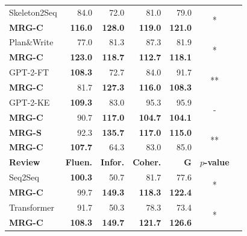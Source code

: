 \documentclass[letterpaper]{article} %
\begin{document}
\begin{table}[t]
{\begin{tabular}{|l|r|r|r|r|c|c|}
     Skeleton2Seq & 84.0 & 72.0  &  81.0 & 79.0&\multirow{2}{*}{*} \\
      \textbf{MRG-C}  & \textbf{116.0}  & \textbf{128.0} & \textbf{119.0} & \textbf{121.0}&\\
  \hline
       Plan\&Write & 77.0 & 81.3  &  87.3 & 81.9&\multirow{2}{*}{*} \\
      \textbf{MRG-C}  & \textbf{123.0}  & \textbf{118.7} & \textbf{112.7} & \textbf{118.1}&\\
  \hline
      GPT-2-FT & \textbf{108.3} &  72.7 &  84.0 & 91.7 &\multirow{2}{*}{**} \\
      \textbf{MRG-C}  &  81.7 & \textbf{127.3} & \textbf{116.0} & \textbf{108.3}&\\
  \hline 
      GPT-2-KE & \textbf{109.3} &  83.0 &  95.3 & 95.9 &\multirow{2}{*}{-} \\
      \textbf{MRG-C}  &  90.7 & \textbf{117.0} & \textbf{104.7} & \textbf{104.1}&\\
  \hline 
      \textbf{MRG-S} & 92.3 & \textbf{135.7}  & \textbf{117.0}  & \textbf{115.0} &\multirow{2}{*}{**} \\
      \textbf{MRG-C}  & \textbf{107.7}  & 64.3 & 83.0 & 85.0 &\\
  \hline
  \hline 
  \textbf{Review} & \textbf{Fluen.}  & \textbf{Infor.} & \textbf{Coher.}& \textbf{G}& \textbf{$p$-value} \\ 
    \hline
     Seq2Seq & \textbf{100.3} & 50.7  & 81.7 & 77.6 &\multirow{2}{*}{*} \\
      \textbf{MRG-C}  &  99.7 & \textbf{149.3}  & \textbf{118.3} & \textbf{122.4} &\\
  \hline
     Transformer & 91.7 &  50.3 & 78.3 & 73.4 &\multirow{2}{*}{*} \\
      \textbf{MRG-C}  & \textbf{108.3}  & \textbf{149.7}  &  \textbf{121.7} & \textbf{126.6} &\\
       
      \hline
    

\end{tabular}}
\end{table}
\end{document}
